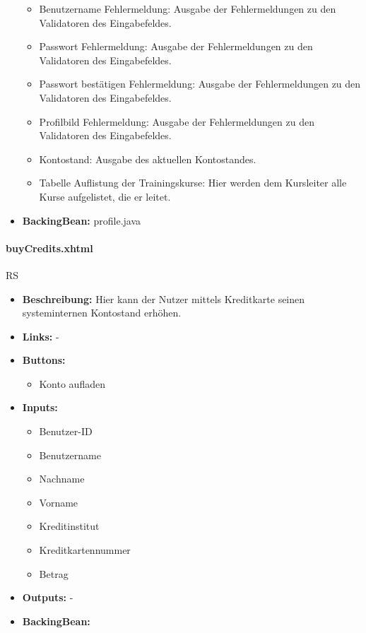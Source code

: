 \begin{itemize}
\begin{itemize}
								\item Benutzername Fehlermeldung: Ausgabe der Fehlermeldungen zu den Validatoren des Eingabefeldes.
								\item Passwort Fehlermeldung: Ausgabe der Fehlermeldungen zu den Validatoren des Eingabefeldes.
								\item Passwort bestätigen Fehlermeldung: Ausgabe der Fehlermeldungen zu den Validatoren des Eingabefeldes.
								\item Profilbild Fehlermeldung: Ausgabe der Fehlermeldungen zu den Validatoren des Eingabefeldes.
								\item Kontostand: Ausgabe des aktuellen Kontostandes.
								\item Tabelle Auflistung der Trainingskurse: Hier werden dem Kursleiter alle Kurse aufgelistet, die er leitet.
							\end{itemize}
						\item \textbf{BackingBean:} profile.java
					\end{itemize}
				
				\paragraph{buyCredits.xhtml}
					RS\\
					\begin{itemize}
						\item \textbf{Beschreibung:} Hier kann der Nutzer mittels Kreditkarte seinen systeminternen Kontostand erhöhen.
						\item \textbf{Links:} -
						\item \textbf{Buttons:}
							\begin{itemize}
								\item Konto aufladen
							\end{itemize}
						\item \textbf{Inputs:}
							\begin{itemize}
								\item Benutzer-ID
								\item Benutzername
								\item Nachname
								\item Vorname
								\item Kreditinstitut
								\item Kreditkartennummer
								\item Betrag
							\end{itemize}
						\item \textbf{Outputs:} -
						\item \textbf{BackingBean:}
					\end{itemize}
				
